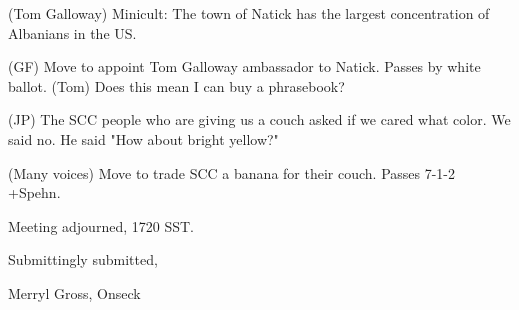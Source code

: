 \documentclass[12pt]{article}
\begin{document}
(Tom Galloway) Minicult: The town of Natick has the largest concentration of Albanians in the US.

(GF) Move to appoint Tom Galloway ambassador to Natick. Passes by white ballot. (Tom) Does this mean I can buy a phrasebook?

(JP) The SCC people who are giving us a couch asked if we cared what color. We said no. He said "How about bright yellow?"

(Many voices) Move to trade SCC a banana for their couch. Passes 7-1-2 +Spehn.

\vspace{12pt}

\noindent
Meeting adjourned, 1720 SST.

\vspace{18pt}

\centerline{Submittingly submitted,}
\centerline{Merryl Gross, Onseck}
\end{document}
